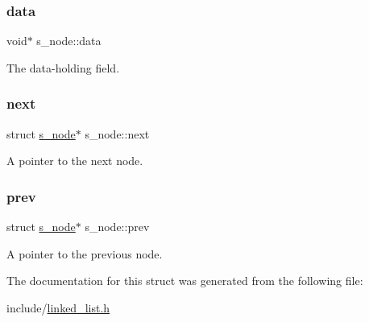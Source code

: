 \subsubsection{\texorpdfstring{data}{data}}
{\footnotesize\ttfamily void$\ast$ s\+\_\+node\+::data}



The data-\/holding field. 

\mbox{\label{structs__node_ac2237e21194d385a2f3d6bd5fdca8045}} 
\subsubsection{\texorpdfstring{next}{next}}
{\footnotesize\ttfamily struct \hyperlink{structs__node}{s\+\_\+node}$\ast$ s\+\_\+node\+::next}



A pointer to the next node. 

\mbox{\label{structs__node_ae95cd17e93d1c2de3174acef62c8dce1}} 
\subsubsection{\texorpdfstring{prev}{prev}}
{\footnotesize\ttfamily struct \hyperlink{structs__node}{s\+\_\+node}$\ast$ s\+\_\+node\+::prev}



A pointer to the previous node. 



The documentation for this struct was generated from the following file\+:\begin{DoxyCompactItemize}
\item 
include/\hyperlink{linked__list_8h}{linked\+\_\+list.\+h}\end{DoxyCompactItemize}
